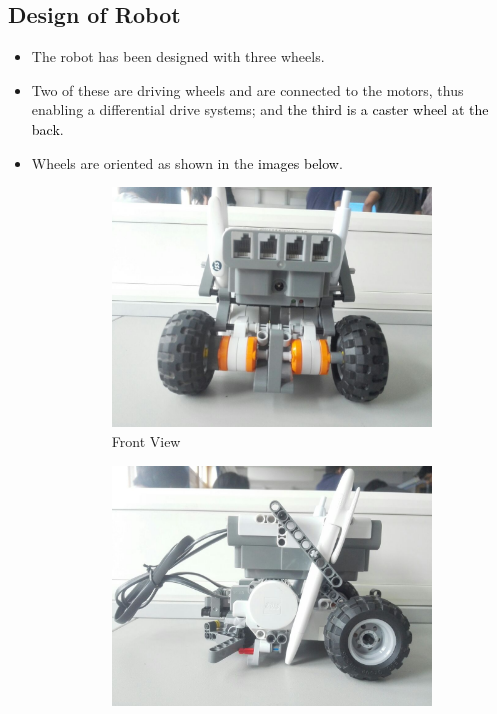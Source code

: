 \documentclass[10pt,a4paper]{article}
\begin{document}
				\subsection{Design of Robot}
					\begin{itemize}
						\item The robot has been designed with three wheels.
						\item Two of these are driving wheels and are connected to the motors, thus enabling a differential drive systems; and \textcolor{black}{the third is a caster wheel at the back}.
						\item Wheels are oriented as shown in the \textcolor{black}{images below}.
						\begin{figure}[H]
							\begin{subfigure}{0.5\textwidth}
								\centering
								\includegraphics[width=0.8\linewidth]{img/front.jpeg}
								\caption{Front View}
								\label{fig:fview}
							\end{subfigure}%
							\begin{subfigure}{0.5\textwidth}
								\centering
								\includegraphics[width=0.8\linewidth]{img/right.jpeg}

\end{subfigure}
\end{figure}
\end{itemize}
\end{document}
